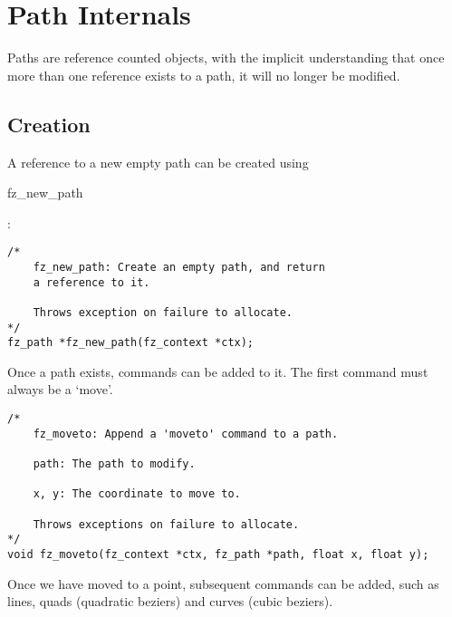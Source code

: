\documentclass[oneside]{book}
\begin{document}
\chapter{Path Internals}
\label{Paths}

Paths are reference counted objects, with the implicit understanding that once more than one reference exists to a path, it will no longer be modified.

\section{Creation}
\label{PathCreation}

A reference to a new empty path can be created using \begin{tt}fz\_new\_path\end{tt}:

\begin{lstlisting}
/*
	fz_new_path: Create an empty path, and return
	a reference to it.

	Throws exception on failure to allocate.
*/
fz_path *fz_new_path(fz_context *ctx);
\end{lstlisting}

Once a path exists, commands can be added to it. The first command must always be a `move'.

\begin{lstlisting}
/*
	fz_moveto: Append a 'moveto' command to a path.

	path: The path to modify.

	x, y: The coordinate to move to.

	Throws exceptions on failure to allocate.
*/
void fz_moveto(fz_context *ctx, fz_path *path, float x, float y);
\end{lstlisting}

Once we have moved to a point, subsequent commands can be added, such as lines, quads (quadratic beziers) and curves (cubic beziers). 
\end{document}

